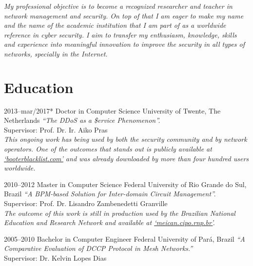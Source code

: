 \documentclass[print]{styles/friggeri-cv-linux} %
\begin{document}
\vspace{-5pt}\setlength\parindent{12pt}\textit{My professional objective is to become a
recognized researcher and teacher in network management and security. On top
of that I am eager to make my name and the name of the academic institution that
I am part of as a worldwide reference in cyber security. I aim to transfer my
enthusiasm, knowledge, skills and experience into meaningful innovation to
improve the security in all types of networks, specially in the Internet.}

\setlength\parindent{0pt}
\section{Education}\vspace{-5pt}

\begin{entrylist}

\entry
{2013--mar/2017*}
{Doctor {\normalfont in Computer Science}}
{University of Twente, The Netherlands}
{\emph{``The DDoS as a \$ervice Phenomenon''.} \\
Supervisor: Prof. Dr. Ir. Aiko Pras\\	
\textit{This ongoing work has being used by both the security community and by
network operators. One of the outcomes that stands out is publicly available at
\href{http://booterblacklist.com}{`booterblacklist.com'} and was already
downloaded by more than four hundred users worldwide.}}

\entry
{2010--2012}
{Master {\normalfont in Computer Science}}
{Federal University of Rio Grande do Sul, Brazil}
{\emph{``A BPM-based Solution for Inter-domain Circuit Management''.}\\
Supervisor: Prof. Dr. Lisandro Zambenedetti Granville\\
\textit{The outcome of this work is still in production used by the Brazilian
National Education and Research Network and available at
\href{http://meican.cipo.rnp.br/}{`meican.cipo.rnp.br'}.}}

\entry
{2005--2010}
{Bachelor {\normalfont in Computer Engineer}}
{Federal University of Par\'a, Brazil}
{\emph{``A Comparative Evaluation of DCCP Protocol in Mesh Networks.''} \\ 
Supervisor: Dr. Kelvin Lopes Dias
}

\end{entrylist}
\end{document}
